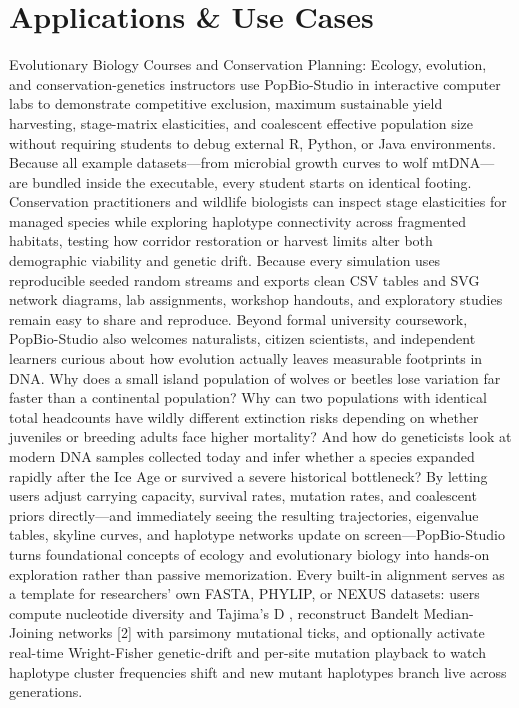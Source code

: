 \documentclass[10pt,letterpaper]{article}
\begin{document}
\section{Applications \& Use Cases}
Evolutionary Biology Courses and Conservation Planning: Ecology, evolution, and conservation-genetics instructors use PopBio-Studio in interactive computer labs to demonstrate competitive exclusion, maximum sustainable yield harvesting, stage-matrix elasticities, and coalescent effective population size without requiring students to debug external R, Python, or Java environments. Because all example datasets---from microbial growth curves to wolf mtDNA---are bundled inside the executable, every student starts on identical footing. Conservation practitioners and wildlife biologists can inspect stage elasticities for managed species while exploring haplotype connectivity across fragmented habitats, testing how corridor restoration or harvest limits alter both demographic viability and genetic drift. Because every simulation uses reproducible seeded random streams and exports clean CSV tables and SVG network diagrams, lab assignments, workshop handouts, and exploratory studies remain easy to share and reproduce. Beyond formal university coursework, PopBio-Studio also welcomes naturalists, citizen scientists, and independent learners curious about how evolution actually leaves measurable footprints in DNA. Why does a small island population of wolves or beetles lose variation far faster than a continental population? Why can two populations with identical total headcounts have wildly different extinction risks depending on whether juveniles or breeding adults face higher mortality? And how do geneticists look at modern DNA samples collected today and infer whether a species expanded rapidly after the Ice Age or survived a severe historical bottleneck? By letting users adjust carrying capacity, survival rates, mutation rates, and coalescent priors directly---and immediately seeing the resulting trajectories, eigenvalue tables, skyline curves, and haplotype networks update on screen---PopBio-Studio turns foundational concepts of ecology and evolutionary biology into hands-on exploration rather than passive memorization. Every built-in alignment serves as a template for researchers' own FASTA, PHYLIP, or NEXUS datasets: users compute nucleotide diversity and Tajima's D , reconstruct Bandelt Median-Joining networks [2] with parsimony mutational ticks, and optionally activate real-time Wright-Fisher genetic-drift and per-site mutation playback to watch haplotype cluster frequencies shift and new mutant haplotypes branch live across generations.
\end{document}
